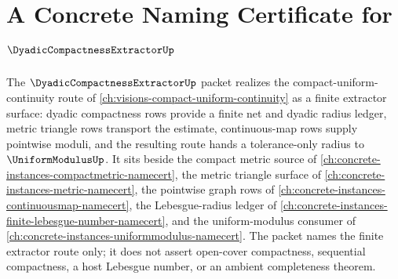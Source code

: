 \chapter{A Concrete Naming Certificate for $\DyadicCompactnessExtractorUp$}
\label{ch:concrete-instances-dyadic-compactness-extractor-namecert}

The $\DyadicCompactnessExtractorUp$ packet realizes the compact-uniform-continuity route of \autoref{ch:visions-compact-uniform-continuity} as a finite extractor surface: dyadic compactness rows provide a finite net and dyadic radius ledger, metric triangle rows transport the estimate, continuous-map rows supply pointwise moduli, and the resulting route hands a tolerance-only radius to $\UniformModulusUp$. It sits beside the compact metric source of \autoref{ch:concrete-instances-compactmetric-namecert}, the metric triangle surface of \autoref{ch:concrete-instances-metric-namecert}, the pointwise graph rows of \autoref{ch:concrete-instances-continuousmap-namecert}, the Lebesgue-radius ledger of \autoref{ch:concrete-instances-finite-lebesgue-number-namecert}, and the uniform-modulus consumer of \autoref{ch:concrete-instances-uniformmodulus-namecert}. The packet names the finite extractor route only; it does not assert open-cover compactness, sequential compactness, a host Lebesgue number, or an ambient completeness theorem.


